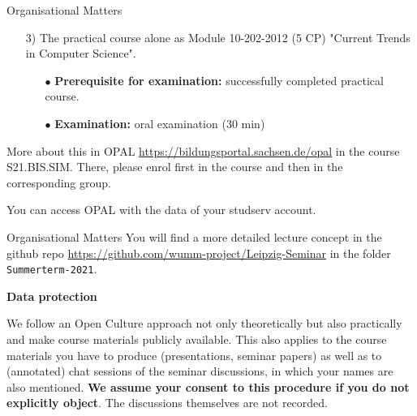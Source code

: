 \documentclass{beamer}
\newcommand{\ueberschrift}[1]{\begin{center}\bf #1\end{center}}
\begin{document}
\begin{frame}{Organisational Matters}
\begin{itemize}
\item[3)] The practical course alone as Module 10-202-2012 (5 CP) "Current
  Trends in Computer Science".
  \begin{itemize}[noitemsep]
  \item[$\bullet$] \textbf{Prerequisite for examination:} successfully
    completed practical course.
  \item[$\bullet$] \textbf{Examination:} oral examination (30 min)
  \end{itemize}
\end{itemize}
More about this in OPAL \url{https://bildungsportal.sachsen.de/opal} in the
course S21.BIS.SIM.  There, please enrol first in the course and then in the
corresponding group.

You can access OPAL with the data of your studserv account.

\end{frame}

\begin{frame}{Organisational Matters}
You will find a more detailed lecture concept in the github repo
\url{https://github.com/wumm-project/Leipzig-Seminar} in the folder
\texttt{Summerterm-2021}.

\ueberschrift{Data protection}

We follow an Open Culture approach not only theoretically but also practically
and make course materials publicly available. This also applies to the course
materials you have to produce (presentations, seminar papers) as well as to
(annotated) chat sessions of the seminar discussions, in which your names are
also mentioned. \textbf{We assume your consent to this procedure if you do not
  explicitly object}. The discussions themselves are not recorded.

\end{frame}
\end{document}
